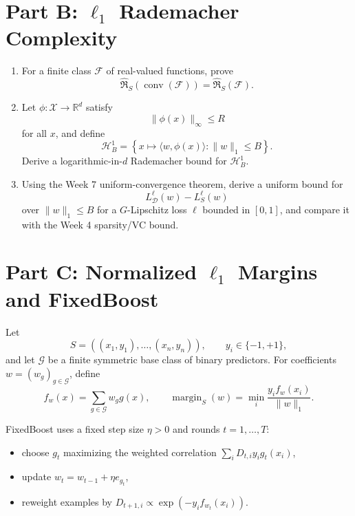 \documentclass{article}
\begin{document}
\section{Part B: \texorpdfstring{$\ell_1$}{l1} Rademacher Complexity}

\begin{enumerate}
\item For a finite class $\mathcal{F}$ of real-valued functions, prove
$$
\widehat{\mathfrak{R}}_S(\operatorname{conv}(\mathcal{F}))
=
\widehat{\mathfrak{R}}_S(\mathcal{F}).
$$

\item Let $\phi : \mathcal{X}\to \mathbb{R}^d$ satisfy
$$
\|\phi(x)\|_\infty \le R
$$
for all $x$, and define
$$
\mathcal{H}^1_B
=
\left\{
x \mapsto \langle w,\phi(x)\rangle
:
\|w\|_1 \le B
\right\}.
$$
Derive a logarithmic-in-$d$ Rademacher bound for $\mathcal{H}^1_B$.

\item Using the Week 7 uniform-convergence theorem, derive a uniform bound for
$$
L^\ell_{\mathcal{D}}(w)-L^\ell_S(w)
$$
over $\|w\|_1\le B$ for a $G$-Lipschitz loss $\ell$ bounded in $[0,1]$, and compare it with the Week 4 sparsity/VC bound.
\end{enumerate}

\section{Part C: \texorpdfstring{Normalized $\ell_1$ Margins and FixedBoost}{Normalized l1 Margins and FixedBoost}}

Let
$$
S=((x_1,y_1),\dots,(x_n,y_n)),
\qquad
y_i\in\{-1,+1\},
$$
and let $\mathcal{G}$ be a finite symmetric base class of binary predictors. For coefficients $w=(w_g)_{g\in\mathcal{G}}$, define
$$
f_w(x)=\sum_{g\in\mathcal{G}} w_g g(x),
\qquad
\operatorname{margin}_S(w)=\min_i \frac{y_i f_w(x_i)}{\|w\|_1}.
$$

FixedBoost uses a fixed step size $\eta>0$ and rounds $t=1,\dots,T$:
\begin{itemize}
\item choose $g_t$ maximizing the weighted correlation $\sum_i D_{t,i} y_i g_t(x_i)$,
\item update $w_t=w_{t-1}+\eta e_{g_t}$,
\item reweight examples by $D_{t+1,i}\propto \exp(-y_i f_{w_t}(x_i))$.
\end{itemize}
\end{document}
